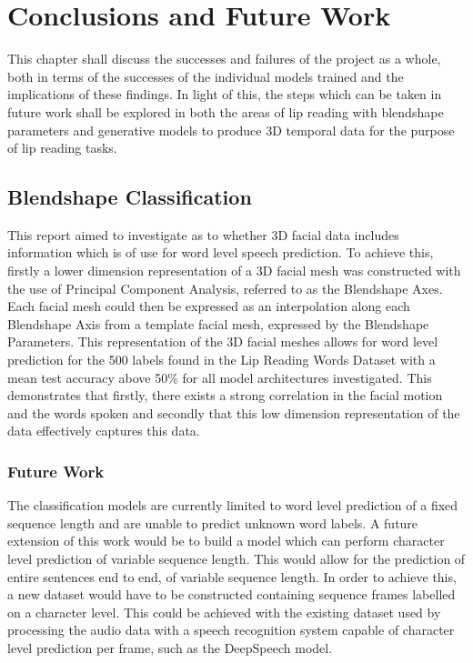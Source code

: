 \chapter{Conclusions and Future Work}

This chapter shall discuss the successes and failures of the project as a whole, both in terms of the successes of the individual models trained and the implications of these findings.
In light of this, the steps which can be taken in future work shall be explored in both the areas of lip reading with blendshape parameters and generative models to produce 3D temporal data for the purpose of lip reading tasks.

\section{Blendshape Classification}\label{sec:class_conc}
This report aimed to investigate as to whether 3D facial data includes information which is of use for word level speech prediction.
To achieve this, firstly a lower dimension representation of a 3D facial mesh was constructed with the use of Principal Component Analysis, referred to as the Blendshape Axes.
Each facial mesh could then be expressed as an interpolation along each Blendshape Axis from a template facial mesh, expressed by the Blendshape Parameters.
This representation of the 3D facial meshes allows for word level prediction for the 500 labels found in the Lip Reading Words Dataset with a mean test accuracy above 50\% for all model architectures investigated.
This demonstrates that firstly, there exists a strong correlation in the facial motion and the words spoken and secondly that this low dimension representation of the data effectively captures this data.

\subsection{Future Work}
The classification models are currently limited to word level prediction of a fixed sequence length and are unable to predict unknown word labels.
A future extension of this work would be to build a model which can perform character level prediction of variable sequence length.
This would allow for the prediction of entire sentences end to end, of variable sequence length.
In order to achieve this, a new dataset would have to be constructed containing sequence frames labelled on a character level.
This could be achieved with the existing dataset used by processing the audio data with a speech recognition system capable of character level prediction per frame, such as the DeepSpeech model.

